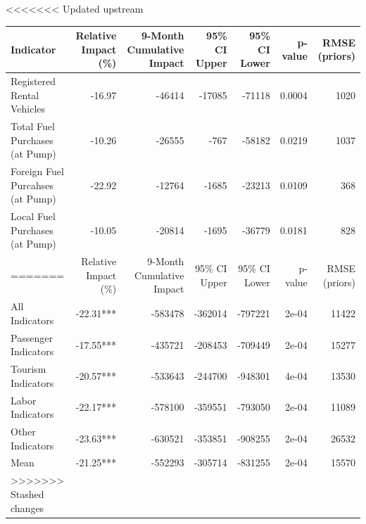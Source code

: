 
<<<<<<< Updated upstream
\begin{tabular}[t]{l|r|r|r|r|r|r}
\hline
Indicator & Relative Impact (\%) & 9-Month Cumulative Impact & 95\% CI Upper & 95\% CI Lower & p-value & RMSE (priors)\\
\hline
Registered Rental Vehicles & -16.97 & -46414 & -17085 & -71118 & 0.0004 & 1020\\
\hline
Total Fuel Purchases (at Pump) & -10.26 & -26555 & -767 & -58182 & 0.0219 & 1037\\
\hline
Foreign Fuel Purcahses (at Pump) & -22.92 & -12764 & -1685 & -23213 & 0.0109 & 368\\
\hline
Local Fuel Purchases (at Pump) & -10.05 & -20814 & -1695 & -36779 & 0.0181 & 828\\
=======
\begin{tabular}[t]{l|l|r|r|r|r|r}
\hline
Indicator & Relative Impact (\%) & 9-Month Cumulative Impact & 95\% CI Upper & 95\% CI Lower & p-value & RMSE (priors)\\
\hline
All Indicators & -22.31*** & -583478 & -362014 & -797221 & 2e-04 & 11422\\
\hline
Passenger Indicators & -17.55*** & -435721 & -208453 & -709449 & 2e-04 & 15277\\
\hline
Tourism Indicators & -20.57*** & -533643 & -244700 & -948301 & 4e-04 & 13530\\
\hline
Labor Indicators & -22.17*** & -578100 & -359551 & -793050 & 2e-04 & 11089\\
\hline
Other Indicators & -23.63*** & -630521 & -353851 & -908255 & 2e-04 & 26532\\
\hline
Mean & -21.25*** & -552293 & -305714 & -831255 & 2e-04 & 15570\\
>>>>>>> Stashed changes
\hline
\end{tabular}
